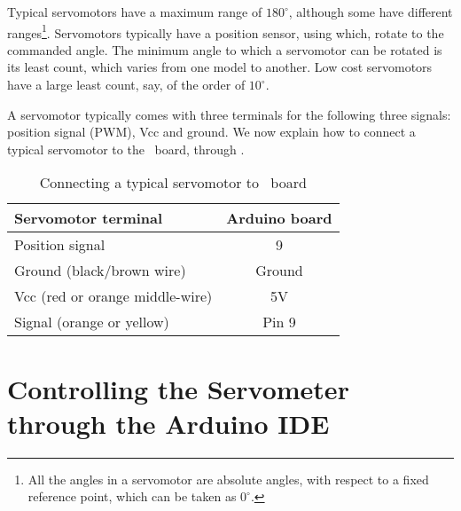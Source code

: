 Typical servomotors have a maximum range of $180^\circ$, although some
have different ranges\footnote{All the angles in a servomotor are
  absolute angles, with respect to a fixed reference point, which can
  be taken as $0^\circ$.}.
Servomotors typically have a position sensor,
using which, rotate to the commanded angle.  The minimum angle to
which a servomotor can be rotated is its least count, which varies
from one model to another.  Low cost servomotors have a large least
count, say, of the order of $10^\circ$.

A servomotor typically comes with three terminals for the
following three signals: position signal (PWM), Vcc and ground.
We now explain how to connect a typical servomotor to the \arduino\
board, through .
\begin{table}
\centering
\caption{Connecting a typical servomotor to \arduino\ board}
\label{tab:servo-connect}
\begin{tabular}{lc}\hline
Servomotor terminal & Arduino board \\ \hline
Position signal & 9 \\
Ground (black/brown wire) & Ground \\ 
Vcc (red or orange middle-wire) & 5V \\
Signal (orange or yellow) & Pin 9 \\ \hline
\end{tabular}
\end{table}

\section{Controlling the Servometer through the Arduino IDE}

